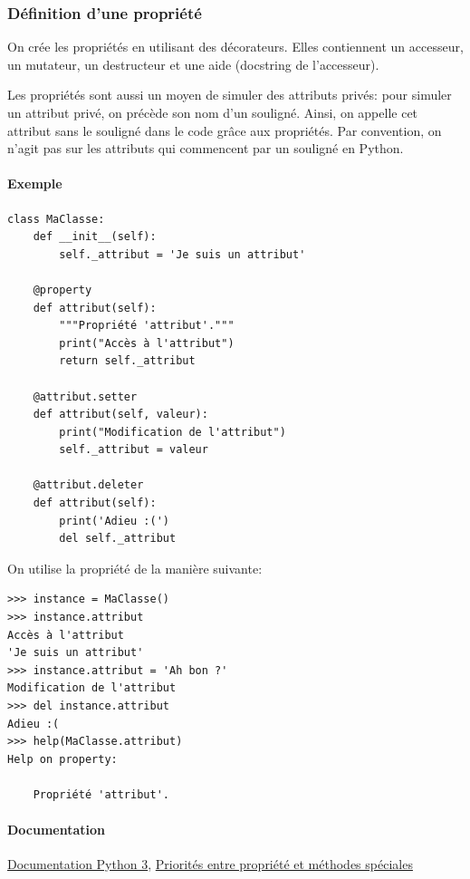 \documentclass[a4paper, 10pt]{article}
\begin{document}
\subsubsection{Définition d'une propriété}

On crée les propriétés en utilisant des décorateurs. Elles contiennent un accesseur, un mutateur, un destructeur et une aide (docstring de l'accesseur).\bigskip

Les propriétés sont aussi un moyen de simuler des attributs privés: pour simuler un attribut privé, on précède son nom d'un souligné. Ainsi, on appelle cet attribut sans le souligné dans le code grâce aux propriétés. Par convention, on n'agit pas sur les attributs qui commencent par un souligné en Python.

\paragraph{Exemple}
\begin{verbatim}
class MaClasse:
    def __init__(self):
        self._attribut = 'Je suis un attribut'

    @property
    def attribut(self):
        """Propriété 'attribut'."""
        print("Accès à l'attribut")
        return self._attribut

    @attribut.setter
    def attribut(self, valeur):
        print("Modification de l'attribut")
        self._attribut = valeur

    @attribut.deleter
    def attribut(self):
        print('Adieu :(')
        del self._attribut
\end{verbatim}

On utilise la propriété de la manière suivante:
\begin{Verbatim}[frame = single, fontsize = \footnotesize]
>>> instance = MaClasse()
>>> instance.attribut
Accès à l'attribut
'Je suis un attribut'
>>> instance.attribut = 'Ah bon ?'
Modification de l'attribut
>>> del instance.attribut
Adieu :(
>>> help(MaClasse.attribut)
Help on property:

    Propriété 'attribut'.

\end{Verbatim}

\paragraph{Documentation}\href{https://docs.python.org/fr/3/library/functions.html?highlight=property#property}{Documentation Python 3}, \href{https://stackoverflow.com/questions/15750522/class-properties-and-setattr/15751159#15751159}{Priorités entre propriété et méthodes spéciales}
\end{document}
